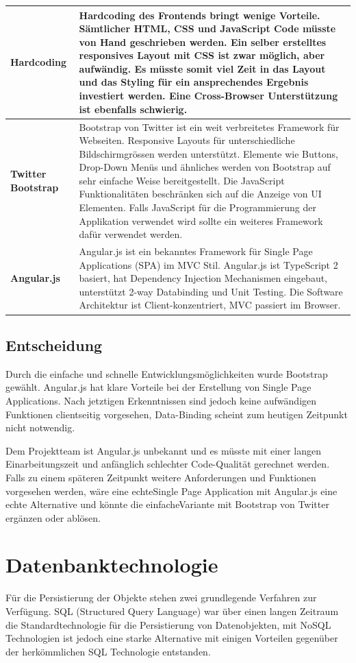\begin{longtable}{| p{4cm} | p{11.7cm} |}
 \hline
  \textbf{Hardcoding} & Hardcoding des Frontends bringt wenige Vorteile. Sämtlicher HTML, CSS und JavaScript Code müsste von Hand geschrieben werden. Ein selber erstelltes responsives Layout mit CSS ist zwar möglich, aber aufwändig. Es müsste somit viel Zeit in das Layout und das Styling für ein ansprechendes Ergebnis investiert werden. Eine Cross-Browser Unterstützung ist ebenfalls schwierig.\\ \hline 
 \textbf{Twitter Bootstrap} & Bootstrap von Twitter ist ein weit verbreitetes Framework für Webseiten. Responsive Layouts für unterschiedliche Bildschirmgrössen werden unterstützt. Elemente wie Buttons, Drop-Down Menüs und ähnliches werden von Bootstrap auf sehr einfache Weise bereitgestellt. Die JavaScript Funktionalitäten beschränken sich auf die Anzeige von UI Elementen. Falls JavaScript für die Programmierung der Applikation verwendet wird sollte ein weiteres Framework dafür verwendet werden.\\ \hline 
 \textbf{Angular.js} & Angular.js ist ein bekanntes Framework für Single Page Applications (SPA) im MVC Stil. Angular.js ist TypeScript 2 basiert, hat Dependency Injection Mechanismen eingebaut, unterstützt 2-way Databinding und Unit Testing. Die Software Architektur ist Client-konzentriert, MVC passiert im Browser.\\ \hline
\end{longtable}

\subsection{Entscheidung}
Durch die einfache und schnelle Entwicklungsmöglichkeiten wurde Bootstrap gewählt. Angular.js hat klare Vorteile bei der Erstellung von Single Page Applications. Nach jetztigen Erkenntnissen sind jedoch keine aufwändigen Funktionen clientseitig vorgesehen, Data-Binding scheint zum heutigen Zeitpunkt nicht notwendig. 

Dem Projektteam ist Angular.js unbekannt und es müsste mit einer langen Einarbeitungszeit und anfänglich schlechter Code-Qualität gerechnet werden. Falls zu einem späteren Zeitpunkt weitere Anforderungen und Funktionen vorgesehen werden, wäre eine \glqq echte\grqq  Single Page Application mit Angular.js eine echte Alternative und könnte die \glqq einfache\grqq Variante mit Bootstrap von Twitter ergänzen oder ablösen.

\newpage
\section{Datenbanktechnologie}
Für die Persistierung der Objekte stehen zwei grundlegende Verfahren zur Verfügung. SQL (Structured Query Language) war über einen langen Zeitraum die Standardtechnologie für die Persistierung von Datenobjekten, mit NoSQL Technologien ist jedoch eine starke Alternative mit einigen Vorteilen gegenüber der herkömmlichen SQL Technologie entstanden.

